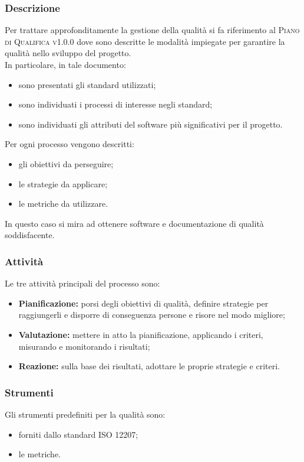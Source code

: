     \subsubsection{Descrizione}
    Per trattare approfonditamente la gestione della qualità si fa riferimento al \textsc{Piano di Qualifica v1.0.0} dove sono descritte le modalità impiegate per garantire la qualità nello sviluppo del progetto.\\In particolare, in tale documento:
    \begin{itemize}
    	\item sono presentati gli standard utilizzati;
    	\item sono individuati i processi di interesse negli standard;
    	\item sono individuati gli attributi del software più significativi per il progetto.
    \end{itemize}
	Per ogni processo vengono descritti:
	\begin{itemize}
		\item gli obiettivi da perseguire;
		\item le strategie da applicare;
		\item le metriche da utilizzare.
	\end{itemize}
	In questo caso si mira ad ottenere software e documentazione di qualità soddisfacente.
    \subsubsection{Attività}
    Le tre attività principali del processo sono:
    \begin{itemize}
    	\item \textbf{Pianificazione:} porsi degli obiettivi di qualità, definire strategie per raggiungerli e disporre di conseguenza persone e risore nel modo migliore;
    	\item \textbf{Valutazione:} mettere in atto la pianificazione, applicando i criteri, misurando e monitorando i risultati;
    	\item \textbf{Reazione:} sulla base dei risultati, adottare le proprie strategie e criteri.
    \end{itemize}
	\subsubsection{Strumenti}
	Gli strumenti predefiniti per la qualità sono:
	\begin{itemize}
		\item forniti dallo standard ISO 12207;
		\item le metriche.
	\end{itemize}
